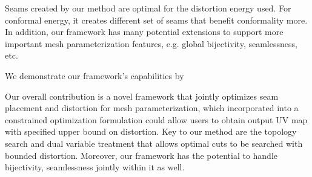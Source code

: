 Seams created by our method are optimal for the distortion energy used. For conformal energy, it creates different set of seams that benefit conformality more. In addition, our framework has many potential extensions to support more important mesh parameterization features, e.g. global bijectivity, seamlessness, etc.

We demonstrate our framework's capabilities by 

Our overall contribution is a novel framework that jointly optimizes seam placement and distortion for mesh parameterization, which incorporated into a constrained optimization formulation could allow users to obtain output UV map with specified upper bound on distortion. Key to our method are the topology search and dual variable treatment that allows optimal cuts to be searched with bounded distortion. Moreover, our framework has the potential to handle bijectivity, seamlessness jointly within it as well.
